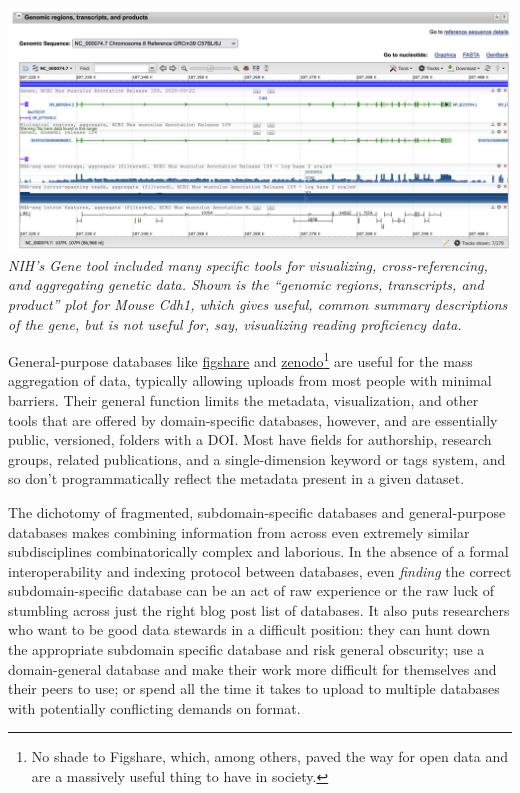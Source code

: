 \documentclass[notoc]{tufte-book}
\begin{document}
\includegraphics[width=\linewidth]{../assets/images/nih_gene_cdh1.png}
\emph{NIH's Gene tool included many specific tools for visualizing,
cross-referencing, and aggregating genetic data. Shown is the ``genomic
regions, transcripts, and product'' plot for Mouse Cdh1, which gives
useful, common summary descriptions of the gene, but is not useful for,
say, visualizing reading proficiency data.}

General-purpose databases like \href{https://figshare.com/}{figshare}
and \href{https://zenodo.org/}{zenodo}\footnote{No shade to Figshare,
  which, among others, paved the way for open data and are a massively
  useful thing to have in society.} are useful for the mass aggregation
of data, typically allowing uploads from most people with minimal
barriers. Their general function limits the metadata, visualization, and
other tools that are offered by domain-specific databases, however, and
are essentially public, versioned, folders with a DOI. Most have fields
for authorship, research groups, related publications, and a
single-dimension keyword or tags system, and so don't programmatically
reflect the metadata present in a given dataset.

The dichotomy of fragmented, subdomain-specific databases and
general-purpose databases makes combining information from across even
extremely similar subdisciplines combinatorically complex and laborious.
In the absence of a formal interoperability and indexing protocol
between databases, even \emph{finding} the correct subdomain-specific
database can be an act of raw experience or the raw luck of stumbling
across just the right blog post list of databases. It also puts
researchers who want to be good data stewards in a difficult position:
they can hunt down the appropriate subdomain specific database and risk
general obscurity; use a domain-general database and make their work
more difficult for themselves and their peers to use; or spend all the
time it takes to upload to multiple databases with potentially
conflicting demands on format.
\end{document}
